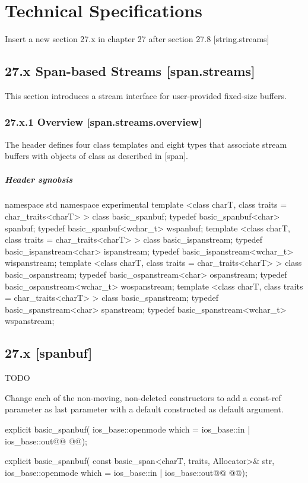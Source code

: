 \documentclass[ebook,11pt,article]{memoir}
\begin{document}
\chapter{Technical Specifications}
Insert a new section 27.x in chapter 27 after section 27.8 [string.streams]

\section{27.x Span-based Streams [span.streams]}
This section introduces a stream interface for user-provided fixed-size buffers. 
\subsection{27.x.1 Overview [span.streams.overview]}
The header  defines four class templates and eight types that associate stream buffers with objects of class  as described in [span].

\paragraph{Header  synobsis}

\begin{codeblock}
namespace std {
namespace experimental {
  template <class charT, class traits = char_traits<charT> >
    class basic_spanbuf;
  typedef basic_spanbuf<char>     spanbuf;
  typedef basic_spanbuf<wchar_t> wspanbuf;
  template <class charT, class traits = char_traits<charT> >
    class basic_ispanstream;
  typedef basic_ispanstream<char>     ispanstream;
  typedef basic_ispanstream<wchar_t> wispanstream;
  template <class charT, class traits = char_traits<charT> >
    class basic_ospanstream;
  typedef basic_ospanstream<char>     ospanstream;
  typedef basic_ospanstream<wchar_t> wospanstream;
  template <class charT, class traits = char_traits<charT> >
    class basic_spanstream;
  typedef basic_spanstream<char>     spanstream;
  typedef basic_spanstream<wchar_t> wspanstream;
}}
\end{codeblock}
\section{27.x  [spanbuf]}

{{\Large TODO}}

Change each of the non-moving, non-deleted constructors to add a const-ref  parameter as last parameter with a default constructed  as default argument. 
\begin{codeblock}
explicit basic_spanbuf(
        ios_base::openmode which = ios_base::in | ios_base::out@\ins{,}@
        @@);

explicit basic_spanbuf(
        const basic_span<charT, traits, Allocator>& str,
        ios_base::openmode which = ios_base::in | ios_base::out@\ins{,}@
        @@);
\end{codeblock}
\end{document}
